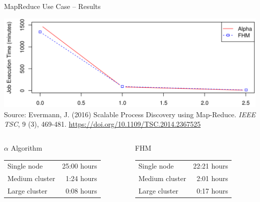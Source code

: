 \documentclass[ignorenonframetext,xcolor=x11names]{beamer}
\begin{document}
\begin{frame}{MapReduce Use Case -- Results}
\begin{center}
\includegraphics[width=.9\textwidth]{screen2.png} \\
\scriptsize
\vspace{\baselineskip}
Source: Evermann, J. (2016) Scalable Process Discovery using Map-Reduce. \emph{IEEE TSC}, 9 (3), 469-481. \footnotesize \url{https://doi.org/10.1109/TSC.2014.2367525}
\end{center}
\small
\begin{columns}
\begin{column}{.47\textwidth}
\begin{block}{$\alpha$ Algorithm}
\begin{tabular}{lr} \hline
Single node & 25:00 hours \\
Medium cluster & 1:24 hours \\
Large cluster & 0:08 hours \\ \hline
\end{tabular}
\end{block}
\end{column}

\begin{column}{.47\textwidth}
\begin{block}{FHM}
\begin{tabular}{lr} \hline
Single node & 22:21 hours\\
Medium cluster & 2:01 hours \\
Large cluster & 0:17 hours \\ \hline
\end{tabular}
\end{block}
\end{column}
\end{columns}
\end{frame}
\end{document}
